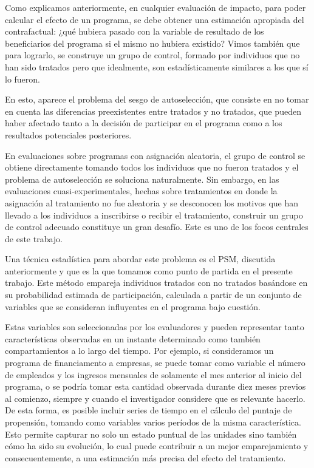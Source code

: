 \documentclass[../main.tex]{subfiles}
\begin{document}
Como explicamos anteriormente, en cualquier evaluación de impacto, para poder calcular el
efecto de un programa, se debe obtener una estimación apropiada del contrafactual: ¿qué
hubiera pasado con la variable de resultado de los beneficiarios del programa si el mismo
no hubiera existido? Vimos también que para lograrlo, se construye un grupo de control,
formado por individuos que no han sido tratados pero que idealmente, son estadísticamente
similares a los que sí lo fueron.

En esto, aparece el problema del sesgo de autoselección, que consiste en no tomar en
cuenta las diferencias preexistentes entre tratados y no tratados, que pueden haber
afectado tanto a la decisión de participar en el programa como a los resultados
potenciales posteriores.

En evaluaciones sobre programas con asignación aleatoria, el grupo de control se obtiene
directamente tomando todos los individuos que no fueron tratados y el problema de
autoselección se soluciona naturalmente. Sin embargo, en las evaluaciones
cuasi-experimentales, hechas sobre tratamientos en donde la asignación al tratamiento no
fue aleatoria y se desconocen los motivos que han llevado a los individuos a inscribirse o
recibir el tratamiento, construir un grupo de control adecuado constituye un gran desafío.
Este es uno de los focos centrales de este trabajo.

Una técnica estadística para abordar este problema es el PSM, discutida anteriormente y
que es la que tomamos como punto de partida en el presente trabajo. Este método empareja
individuos tratados con no tratados basándose en su probabilidad estimada de
participación, calculada a partir de un conjunto de variables que se consideran
influyentes en el programa bajo cuestión.

Estas variables son seleccionadas por los evaluadores y pueden representar tanto
características observadas en un instante determinado como también compartamientos a lo
largo del tiempo. Por ejemplo, si consideramos un programa de financiamento a empresas, se
puede tomar como variable el número de empleados y los ingresos mensuales de solamente el
mes anterior al inicio del programa, o se podría tomar esta cantidad observada durante
diez meses previos al comienzo, siempre y cuando el investigador considere que es
relevante hacerlo. De esta forma, es posible incluir series de tiempo en el cálculo del
puntaje de propensión, tomando como variables varios períodos de la misma característica.
Esto permite capturar no solo un estado puntual de las unidades sino también cómo ha sido
su evolución, lo cual puede contribuir a un mejor emparejamiento y consecuentemente, a una
estimación más precisa del efecto del tratamiento.
\end{document}
